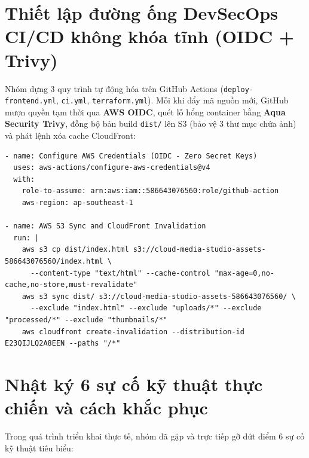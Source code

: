 \documentclass[12pt,a4paper]{report}
\begin{document}
\section{Thiết lập đường ống DevSecOps CI/CD không khóa tĩnh (OIDC + Trivy)}
Nhóm dựng 3 quy trình tự động hóa trên GitHub Actions (\texttt{deploy-frontend.yml}, \texttt{ci.yml}, \texttt{terraform.yml}). Mỗi khi đẩy mã nguồn mới, GitHub mượn quyền tạm thời qua \textbf{AWS OIDC}, quét lỗ hổng container bằng \textbf{Aqua Security Trivy}, đồng bộ bản build \texttt{dist/} lên S3 (bảo vệ 3 thư mục chứa ảnh) và phát lệnh xóa cache CloudFront:

\begin{lstlisting}[caption={Trích đoạn luồng triển khai xác thực OIDC và xóa cache biên trong \texttt{deploy-frontend.yml}}]
- name: Configure AWS Credentials (OIDC - Zero Secret Keys)
  uses: aws-actions/configure-aws-credentials@v4
  with:
    role-to-assume: arn:aws:iam::586643076560:role/github-action
    aws-region: ap-southeast-1

- name: AWS S3 Sync and CloudFront Invalidation
  run: |
    aws s3 cp dist/index.html s3://cloud-media-studio-assets-586643076560/index.html \
      --content-type "text/html" --cache-control "max-age=0,no-cache,no-store,must-revalidate"
    aws s3 sync dist/ s3://cloud-media-studio-assets-586643076560/ \
      --exclude "index.html" --exclude "uploads/*" --exclude "processed/*" --exclude "thumbnails/*"
    aws cloudfront create-invalidation --distribution-id E23QIJLQ2A8EEN --paths "/*"
\end{lstlisting}

\section{Nhật ký 6 sự cố kỹ thuật thực chiến và cách khắc phục}
Trong quá trình triển khai thực tế, nhóm đã gặp và trực tiếp gỡ dứt điểm 6 sự cố kỹ thuật tiêu biểu:
\end{document}

